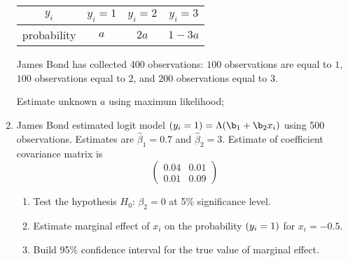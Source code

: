 \documentclass[12pt]{article}
\let\P\relax
\DeclareMathOperator{\P}{\mathbb{P}}
\def \hb{\hat{\beta}}
\begin{document}
\begin{enumerate}
    \begin{tabular}{cccc}
      \toprule
      $y_i$ & $y_i = 1$ & $y_i = 2$ & $y_i = 3$ \\
      \midrule
      probability & $a$ & $2a$ & $1 - 3a$ \\
      \bottomrule
    \end{tabular}

    James Bond has collected 400 observations: $100$ observations are equal to $1$, $100$ observations equal to $2$, and $200$ observations equal to $3$.

    Estimate unknown $a$ using maximum likelihood;


  \item James Bond estimated logit model 
\(
\P(y_i=1)=\Lambda(\b_1+\b_2 x_i)
\)
using 500 observations. Estimates are $\hb_1=0.7$ and $\hb_2=3$. Estimate of coefficient covariance matrix is 
\[
\begin{pmatrix}
  0.04 & 0.01 \\
  0.01 & 0.09
\end{pmatrix}
\]

\begin{enumerate}
\item Test the hypothesis $H_0$: $\beta_2 =0$ at 5\% significance level.
\item Estimate marginal effect of $x_i$ on the probability $\P(y_i=1)$ for $x_i=-0.5$.
\item Build 95\% confidence interval for the true value of marginal effect. 
\end{enumerate}


\end{enumerate}
\end{document}
